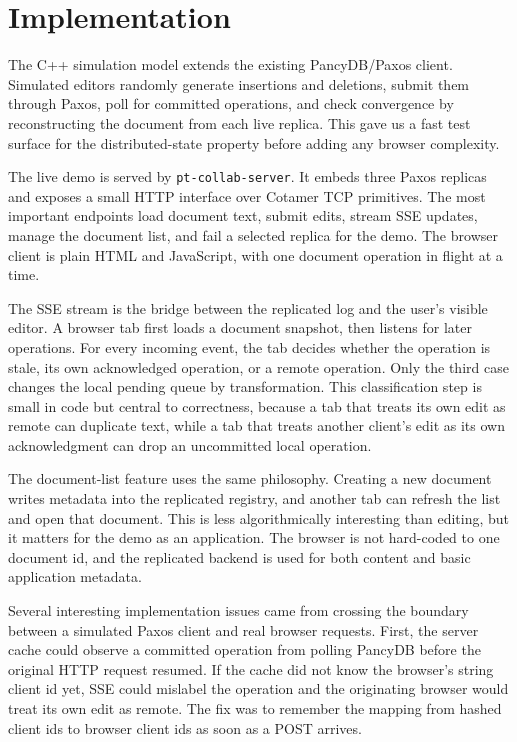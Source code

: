 \documentclass[11pt]{article}
\newcommand{\code}[1]{\texttt{#1}}
\begin{document}
\section{Implementation}

The C++ simulation model extends the existing PancyDB/Paxos client. Simulated editors randomly generate insertions and deletions, submit them through Paxos, poll for committed operations, and check convergence by reconstructing the document from each live replica. This gave us a fast test surface for the distributed-state property before adding any browser complexity.

The live demo is served by \code{pt-collab-server}. It embeds three Paxos replicas and exposes a small HTTP interface over Cotamer TCP primitives. The most important endpoints load document text, submit edits, stream SSE updates, manage the document list, and fail a selected replica for the demo. The browser client is plain HTML and JavaScript, with one document operation in flight at a time.

The SSE stream is the bridge between the replicated log and the user's visible editor. A browser tab first loads a document snapshot, then listens for later operations. For every incoming event, the tab decides whether the operation is stale, its own acknowledged operation, or a remote operation. Only the third case changes the local pending queue by transformation. This classification step is small in code but central to correctness, because a tab that treats its own edit as remote can duplicate text, while a tab that treats another client's edit as its own acknowledgment can drop an uncommitted local operation.

The document-list feature uses the same philosophy. Creating a new document writes metadata into the replicated registry, and another tab can refresh the list and open that document. This is less algorithmically interesting than editing, but it matters for the demo as an application. The browser is not hard-coded to one document id, and the replicated backend is used for both content and basic application metadata.

Several interesting implementation issues came from crossing the boundary between a simulated Paxos client and real browser requests. First, the server cache could observe a committed operation from polling PancyDB before the original HTTP request resumed. If the cache did not know the browser's string client id yet, SSE could mislabel the operation and the originating browser would treat its own edit as remote. The fix was to remember the mapping from hashed client ids to browser client ids as soon as a POST arrives.
\end{document}
